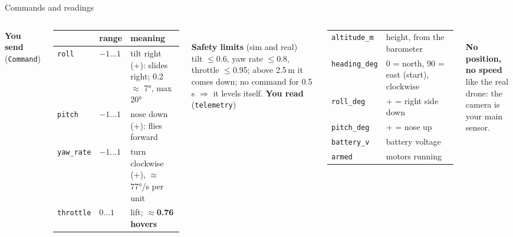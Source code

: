 \documentclass[aspectratio=169,11pt]{beamer}
\newcommand{\code}[1]{\texttt{\small #1}}
\begin{document}
\begin{frame}{Commands and readings}
  \begin{columns}[T]
    \textbf{You send} (\code{Command})\\[1mm]
    \scriptsize
    \begin{tabularx}{\linewidth}{@{}l l X@{}}
      \toprule
      & range & meaning \\
      \midrule
      \code{roll} & $-1\ldots1$ & tilt right (+): slides right; 0.2 $\approx$ 7°, max 20° \\
      \code{pitch} & $-1\ldots1$ & nose down (+): flies forward \\
      \code{yaw\_rate} & $-1\ldots1$ & turn clockwise (+), $\approx$77°/s per unit \\
      \code{throttle} & $0\ldots1$ & lift; \textbf{$\approx$0.76 hovers} \\
      \bottomrule
    \end{tabularx}\\[2mm]
    \normalsize\textbf{Safety limits} (sim and real)\\
    \scriptsize tilt $\leq$0.6, yaw rate $\leq$0.8, throttle $\leq$0.95; above
    2.5\,m it comes down; no command for 0.5\,s $\Rightarrow$ it levels itself.
    \textbf{You read} (\code{telemetry})\\[1mm]
    \scriptsize
    \begin{tabularx}{\linewidth}{@{}l X@{}}
      \toprule
      \code{altitude\_m} & height, from the barometer \\
      \code{heading\_deg} & 0 = north, 90 = east (start), clockwise \\
      \code{roll\_deg} & + = right side down \\
      \code{pitch\_deg} & + = nose up \\
      \code{battery\_v} & battery voltage \\
      \code{armed} & motors running \\
      \bottomrule
    \end{tabularx}\\[2mm]
    \normalsize\textbf{No position, no speed}\\
    \scriptsize like the real drone: the camera is your main sensor.
  \end{columns}
\end{frame}
\end{document}
